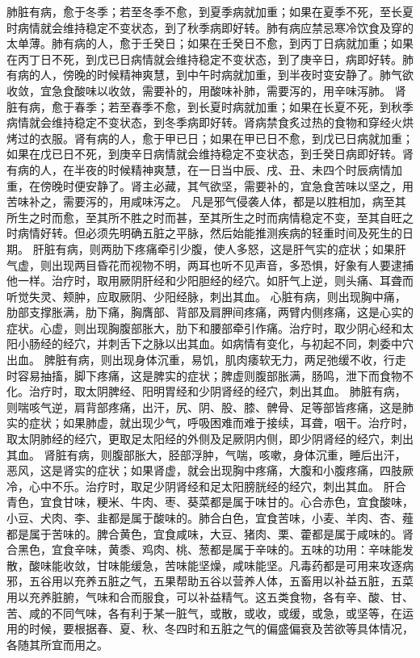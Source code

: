 \documentclass[a4paper,12pt,UTF8,twoside]{ctexbook}
\begin{document}
肺脏有病，愈于冬季；若至冬季不愈，到夏季病就加重；如果在夏季不死，至长夏时病情就会维持稳定不变状态，到了秋季病即好转。肺有病应禁忌寒冷饮食及穿的太单薄。肺有病的人，愈于壬癸日；如果在壬癸日不愈，到丙丁日病就加重；如果在丙丁日不死，到戊已日病情就会维持稳定不变状态，到了庚辛日，病即好转。肺有病的人，傍晚的时候精神爽慧，到中午时病就加重，到半夜时变安静了。肺气欲收敛，宜急食酸味以收敛，需要补的，用酸味补肺，需要泻的，用辛味泻肺。
肾脏有病，愈于春季；若至春季不愈，到长夏时病就加重；如果在长夏不死，到秋季病情就会维持稳定不变状态，到冬季病即好转。肾病禁食炙过热的食物和穿经火烘烤过的衣服。肾有病的人，愈于甲已日；如果在甲已日不愈，到戊已日病就加重；如果在戊已日不死，到庚辛日病情就会维持稳定不变状态，到壬癸日病即好转。肾有病的人，在半夜的时候精神爽慧，在一日当中辰、戌、丑、未四个时辰病情加重，在傍晚时便安静了。肾主必藏，其气欲坚，需要补的，宜急食苦味以坚之，用苦味补之，需要泻的，用咸味泻之。
凡是邪气侵袭人体，都是以胜相加，病至其所生之时而愈，至其所不胜之时而甚，至其所生之时而病情稳定不变，至其自旺之时病情好转。但必须先明确五脏之平脉，然后始能推测疾病的轻重时间及死生的日期。
肝脏有病，则两肋下疼痛牵引少腹，使人多怒，这是肝气实的症状；如果肝气虚，则出现两目昏花而视物不明，两耳也听不见声音，多恐惧，好象有人要逮捕他一样。治疗时，取用厥阴肝经和少阳胆经的经穴。如肝气上逆，则头痛、耳聋而听觉失灵、颊肿，应取厥阴、少阳经脉，刺出其血。
心脏有病，则出现胸中痛，肋部支撑胀满，肋下痛，胸膺部、背部及肩胛间疼痛，两臂内侧疼痛，这是心实的症状。心虚，则出现胸腹部胀大，肋下和腰部牵引作痛。治疗时，取少阴心经和太阳小肠经的经穴，并刺舌下之脉以出其血。如病情有变化，与初起不同，刺委中穴出血。
脾脏有病，则出现身体沉重，易饥，肌肉痿软无力，两足弛缓不收，行走时容易抽搐，脚下疼痛，这是脾实的症状；脾虚则腹部胀满，肠鸣，泄下而食物不化。治疗时，取太阴脾经、阳明胃经和少阴肾经的经穴，刺出其血。
肺脏有病，则喘咳气逆，肩背部疼痛，出汗，尻、阴、股、膝、髀骨、足等部皆疼痛，这是肺实的症状；如果肺虚，就出现少气，呼吸困难而难于接续，耳聋，咽干。治疗时，取太阴肺经的经穴，更取足太阳经的外侧及足厥阴内侧，即少阴肾经的经穴，刺出其血。
肾脏有病，则腹部胀大，胫部浮肿，气喘，咳嗽，身体沉重，睡后出汗，恶风，这是肾实的症状；如果肾虚，就会出现胸中疼痛，大腹和小腹疼痛，四肢厥冷，心中不乐。治疗时，取足少阴肾经和足太阳膀胱经的经穴，刺出其血。
肝合青色，宜食甘味，粳米、牛肉、枣、葵菜都是属于味甘的。心合赤色，宜食酸味，小豆、犬肉、李、韭都是属于酸味的。肺合白色，宜食苦味，小麦、羊肉、杏、薤都是属于苦味的。脾合黄色，宜食咸味，大豆、猪肉、栗、藿都是属于咸味的。肾合黑色，宜食辛味，黄黍、鸡肉、桃、葱都是属于辛味的。五味的功用：辛味能发散，酸味能收敛，甘味能缓急，苦味能坚燥，咸味能坚。凡毒药都是可用来攻逐病邪，五谷用以充养五脏之气，五果帮助五谷以营养人体，五畜用以补益五脏，五菜用以充养脏腑，气味和合而服食，可以补益精气。这五类食物，各有辛、酸、甘、苦、咸的不同气味，各有利于某一脏气，或散，或收，或缓，或急，或坚等，在运用的时候，要根据春、夏、秋、冬四时和五脏之气的偏盛偏衰及苦欲等具体情况，各随其所宜而用之。
\end{document}
